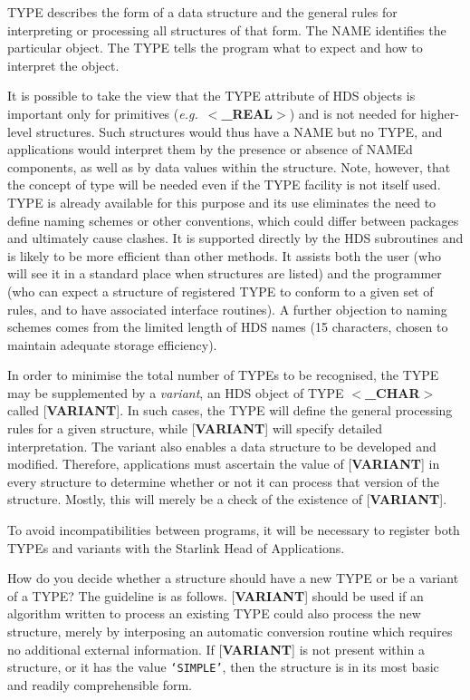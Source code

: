 \documentclass[twoside,11pt,nolof,noabs]{starlink}
\begin{document}
TYPE describes the form of a data structure and the general rules
for interpreting or processing all structures of that form.  The NAME
identifies the particular object.  The TYPE tells the program what to
expect and how to interpret the object.

It is possible to take the view that the TYPE attribute
of HDS objects is important only for
primitives (\textit{e.g.}\  $<$\textbf{\_REAL}$>$) and is not needed for
higher-level structures.
Such structures would thus have a NAME but no TYPE, and applications
would interpret them by the presence or absence of NAMEd components, as
well as by data values within the structure.
Note, however, that the concept of type will be needed even if the
TYPE facility is not itself used.
TYPE is already available for this purpose and its use eliminates
the need to define naming schemes or other conventions, which could
differ between packages and ultimately cause clashes.  It is supported
directly by the HDS subroutines and is likely to be more efficient than
other methods.  It assists both the user (who will see it in a standard
place when structures are listed) and the programmer (who can expect a
structure of registered TYPE to conform to a given set of rules,
and to have associated interface routines).  A
further objection to naming schemes comes from the limited length of HDS
names (15 characters, chosen to maintain adequate storage efficiency).

In order to minimise the total number of TYPEs to be recognised,
the TYPE may be supplemented by
a \textit{variant}, an HDS object
of TYPE $<$\textbf{\_CHAR}$>$
called [\textbf{VARIANT}{]}.  In such cases,
the TYPE will define the general processing rules for a given
structure, while
{[}\textbf{VARIANT}{]}
will specify detailed interpretation.  The variant also enables a data
structure to be developed and modified.  Therefore, applications must
ascertain the value of {[}\textbf{VARIANT}{]} in every structure to
determine whether or not it can process that version of the structure.
Mostly, this will merely be a check of the existence of {[}\textbf{VARIANT}{]}.

To avoid incompatibilities between programs, it will be necessary to
register both TYPEs and variants with the Starlink Head of Applications.

How do you decide whether a structure should have
a new TYPE or be a variant of a TYPE?  The guideline is as
follows.  {[}\textbf{VARIANT}{]} should be used
if an algorithm written to process an existing TYPE could also process
the new structure, merely by interposing an automatic conversion routine
which requires no additional external information.
If {[}\textbf{VARIANT}{]} is not present within a structure,
or it has the value \texttt{`SIMPLE'},
then the structure is in its most basic and readily
comprehensible form.
\end{document}

